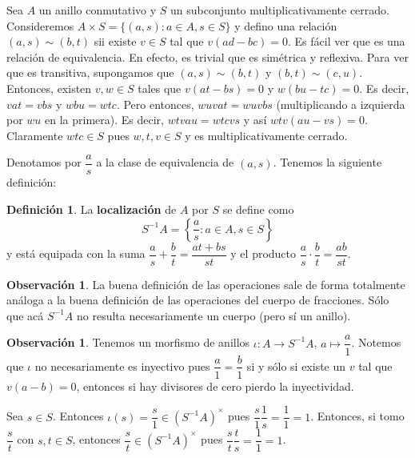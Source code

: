 \documentclass[12pt]{book}
\theoremstyle{definition}
\newtheorem{obs}[teo]{Observación}
\newtheorem{defn}[teo]{Definición}
\begin{document}
Sea $A$ un anillo conmutativo y $S$ un subconjunto multiplicativamente cerrado. Consideremos $A\times S = \{(a,s):a\in A,s\in S\}$ y defino una relación $(a,s)\sim (b,t)$ sii existe $v\in S$ tal que $v(ad-bc)=0$. Es fácil ver que es una relación de equivalencia. En efecto, es trivial que es simétrica y reflexiva. Para ver que es transitiva, supongamos que $(a,s)\sim (b,t)$ y $(b,t)\sim (c,u)$. Entonces, existen $v,w\in S$ tales que $v(at-bs)=0$ y $w(bu-tc)=0$. Es decir, $vat = vbs$ y $wbu=wtc$.
Pero entonces, $wuvat = wuvbs$ (multiplicando a izquierda por $wu$ en la primera). Es decir, $wtvau = wtcvs$ y así $wtv(au-vs)=0$. Claramente $wtc\in S$ pues $w,t,v\in S$ y es multiplicativamente cerrado.

Denotamos por $\dfrac{a}{s}$ a la clase de equivalencia de $(a,s)$. Tenemos la siguiente definición:

\begin{defn}
La \textbf{localización} de $A$ por $S$ se define como $$S^{-1}A = \left\{\dfrac{a}{s} : a\in A, s\in S\right\}$$ y está equipada con la suma $\dfrac{a}{s}+\dfrac{b}{t} = \dfrac{at+bs}{st}$ y el producto $\dfrac{a}{s}\cdot\dfrac{b}{t} = \dfrac{ab}{st}$.
\end{defn}

\begin{obs}
La buena definición de las operaciones sale de forma totalmente análoga a la buena definición de las operaciones del cuerpo de fracciones. Sólo que acá $S^{-1}A$ no resulta necesariamente un cuerpo (pero sí un anillo).
\end{obs}

\begin{obs}
Tenemos un morfismo de anillos $\iota : A\to S^{-1}A$, $a\mapsto \dfrac{a}{1}$. Notemos que $\iota$ no necesariamente es inyectivo pues $\dfrac{a}{1}=\dfrac{b}{1}$ si y sólo si existe un $v$ tal que $v(a-b)=0$, entonces si hay divisores de cero pierdo la inyectividad.

Sea $s\in S$. Entonces $\iota(s) = \dfrac{s}{1}\in (S^{-1}A)^\times$ pues $\dfrac{s}{1}\dfrac{1}{s}=\dfrac{1}{1}=1$. Entonces, si tomo $\dfrac{s}{t}$ con $s,t\in S$, entonces $\dfrac{s}{t}\in (S^{-1}A)^\times$ pues $\dfrac{s}{t}\dfrac{t}{s} = \dfrac{1}{1}=1$.
\end{obs}
\end{document}
